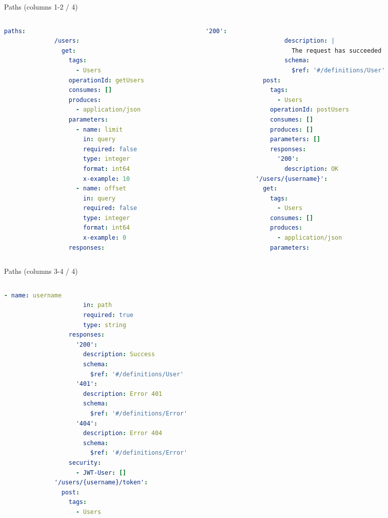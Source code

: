 \begin{frame}
	\begin{exampleblock}{Paths (columns 1-2 / 4)}
		\begin{columns}
		
		\begin{column}{0.48\textwidth}
		\begin{lstlisting}[language=yaml,basicstyle=\tiny]
			paths:
			  /users:
			    get:
			      tags:
			        - Users
			      operationId: getUsers
			      consumes: []
			      produces:
			        - application/json
			      parameters:
			        - name: limit
			          in: query
			          required: false
			          type: integer
			          format: int64
			          x-example: 10
			        - name: offset
			          in: query
			          required: false
			          type: integer
			          format: int64
			          x-example: 0
			      responses:
		\end{lstlisting}
		\end{column}
		
		\begin{column}{0.48\textwidth}
		\begin{lstlisting}[language=yaml,basicstyle=\tiny]
			        '200':
			          description: |
			            The request has succeeded
			          schema:
			            $ref: '#/definitions/User'
			    post:
			      tags:
			        - Users
			      operationId: postUsers
			      consumes: []
			      produces: []
			      parameters: []
			      responses:
			        '200':
			          description: OK
			  '/users/{username}':
			    get:
			      tags:
			        - Users
			      consumes: []
			      produces:
			        - application/json
			      parameters:
		\end{lstlisting}
		\end{column}
		
		\end{columns}
	\end{exampleblock}
	
\begin{exampleblock}{Paths (columns 3-4 / 4)}
		\begin{columns}
		
		\begin{column}{0.48\textwidth}
		\begin{lstlisting}[language=yaml,basicstyle=\tiny]
			        - name: username
			          in: path
			          required: true
			          type: string
			      responses:
			        '200':
			          description: Success
			          schema:
			            $ref: '#/definitions/User'
			        '401':
			          description: Error 401
			          schema:
			            $ref: '#/definitions/Error'
			        '404':
			          description: Error 404
			          schema:
			            $ref: '#/definitions/Error'
			      security: 
			        - JWT-User: []
			  '/users/{username}/token':
			    post:
			      tags:
			        - Users
		\end{lstlisting}
		\end{column}
		

\end{columns}
\end{exampleblock}
\end{frame}
